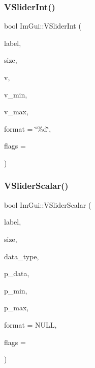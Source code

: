 \mbox{\label{namespaceImGui_a3cf7cf500353bf13250e29d788bd3fff}} 
\subsubsection{\texorpdfstring{V\+Slider\+Int()}{VSliderInt()}}
{\footnotesize\ttfamily bool Im\+Gui\+::\+V\+Slider\+Int (\begin{DoxyParamCaption}\item[{const char $\ast$}]{label,  }\item[{const \hyperlink{structImVec2}{Im\+Vec2} \&}]{size,  }\item[{int $\ast$}]{v,  }\item[{int}]{v\+\_\+min,  }\item[{int}]{v\+\_\+max,  }\item[{const char $\ast$}]{format = {\ttfamily \char`\"{}\%d\char`\"{}},  }\item[{Im\+Gui\+Slider\+Flags}]{flags = {} }\end{DoxyParamCaption})}

\mbox{\label{namespaceImGui_a6ad24ca37a530d43f9d1c727d94e4829}} 
\subsubsection{\texorpdfstring{V\+Slider\+Scalar()}{VSliderScalar()}}
{\footnotesize\ttfamily bool Im\+Gui\+::\+V\+Slider\+Scalar (\begin{DoxyParamCaption}\item[{const char $\ast$}]{label,  }\item[{const \hyperlink{structImVec2}{Im\+Vec2} \&}]{size,  }\item[{Im\+Gui\+Data\+Type}]{data\+\_\+type,  }\item[{\hyperlink{imgui__impl__opengl3__loader_8h_ac668e7cffd9e2e9cfee428b9b2f34fa7}{void} $\ast$}]{p\+\_\+data,  }\item[{const \hyperlink{imgui__impl__opengl3__loader_8h_ac668e7cffd9e2e9cfee428b9b2f34fa7}{void} $\ast$}]{p\+\_\+min,  }\item[{const \hyperlink{imgui__impl__opengl3__loader_8h_ac668e7cffd9e2e9cfee428b9b2f34fa7}{void} $\ast$}]{p\+\_\+max,  }\item[{const char $\ast$}]{format = {\ttfamily NULL},  }\item[{Im\+Gui\+Slider\+Flags}]{flags = {} }\end{DoxyParamCaption})}

